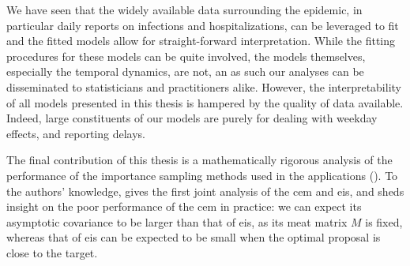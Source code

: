 We have seen that the widely available data surrounding the epidemic, in particular daily reports on infections and hospitalizations, can be leveraged to fit  and the fitted models allow for straight-forward interpretation. While the fitting procedures for these models can be quite involved, the models themselves, especially the temporal dynamics, are not, an as such our analyses can be disseminated to statisticians and practitioners alike. However, the interpretability of all models presented in this thesis is hampered by the quality of data available. Indeed, large constituents of our models are purely for dealing with weekday effects, and reporting delays. 

The final contribution of this thesis is a mathematically rigorous analysis of the performance of the importance sampling methods used in the applications ().
To the authors' knowledge,  gives the first joint analysis of the \acrshort{cem} and \acrshort{eis}, and sheds insight on the poor performance of the \acrshort{cem} in practice: we can expect its asymptotic covariance to be larger than that of \acrshort{eis}, as its meat matrix $M$ is fixed, whereas that of \acrshort{eis} can be expected to be small when the optimal proposal is close to the target. 

